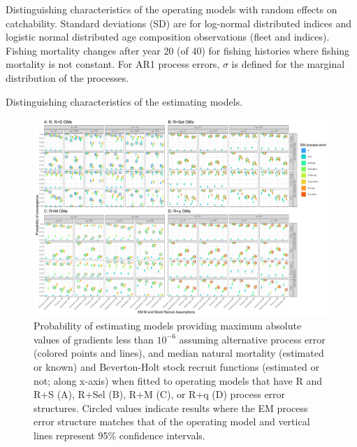 \documentclass[
  12pt,
]{article}
\begin{document}
\begin{landscape}
\begin{table}
\caption{Distinguishing characteristics of the operating models with random effects on catchability. Standard deviations (SD) are for log-normal distributed indices and logistic normal distributed age composition observations (fleet and indices). Fishing mortality changes after year 20 (of 40) for fishing histories where fishing mortality is not constant. For AR1 process errors, $\sigma$ is defined for the marginal distribution of the processes.}\label{q_om_table}
{}
\end{table}
\end{landscape}

\begin{table}
\caption{Distinguishing characteristics of the estimating models.}\label{em_table}
{\scriptsize }
\end{table}

\clearpage

\begin{landscape}
\begin{figure}
\begin{center}
\includegraphics{type_3_convergence_plots}
\end{center}
\caption{Probability of estimating models providing maximum absolute values of gradients less than $10^{-6}$ assuming alternative process error (colored points and lines), and median natural mortality (estimated or known) and Beverton-Holt stock recruit functions (estimated or not; along x-axis) when fitted to operating models that have R and R+S (A), R+Sel (B), R+M (C), or R+q (D) process error structures. Circled values indicate results where the EM process error structure matches that of the operating model and vertical lines represent 95\% confidence intervals.}\label{gradient_convergence}
\end{figure}
\end{landscape}
\end{document}

